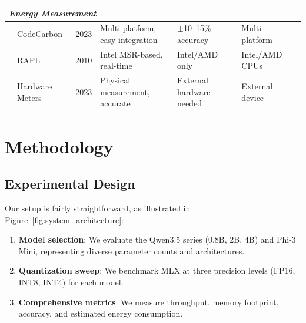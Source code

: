 \documentclass[11pt,a4paper]{article}
\begin{document}
\begin{table}[htbp]
{\begin{tabular}{l l c l l l l}
\midrule
\multicolumn{7}{l}{\textit{Energy Measurement}} \\
\midrule
 & CodeCarbon & 2023 & Multi-platform, easy integration & $\pm$10--15\% accuracy & Multi-platform & \cite{codecarbon2023} \\
 & RAPL & 2010 & Intel MSR-based, real-time & Intel/AMD only & Intel/AMD CPUs & \cite{david2010rapl} \\
 & Hardware Meters & 2023 & Physical measurement, accurate & External hardware needed & External device & \cite{conti2023multiport} \\
\bottomrule
\end{tabular}%
}
\end{table}

\section{Methodology}

\subsection{Experimental Design}

Our setup is fairly straightforward, as illustrated in Figure~\ref{fig:system_architecture}:

\begin{enumerate}[leftmargin=*,nosep]
    \item \textbf{Model selection}: We evaluate the Qwen3.5 series (0.8B, 2B, 4B) and Phi-3 Mini, representing diverse parameter counts and architectures.
    \item \textbf{Quantization sweep}: We benchmark MLX at three precision levels (FP16, INT8, INT4) for each model.
    \item \textbf{Comprehensive metrics}: We measure throughput, memory footprint, accuracy, and estimated energy consumption.
\end{enumerate}
\end{document}
